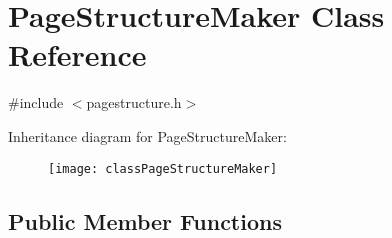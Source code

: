\hypertarget{classPageStructureMaker}{\section{Page\-Structure\-Maker Class Reference}
\label{classPageStructureMaker}
}


{\ttfamily \#include $<$pagestructure.\-h$>$}

Inheritance diagram for Page\-Structure\-Maker\-:\begin{figure}[H]
\begin{center}
\leavevmode
\texttt{[image: classPageStructureMaker]}
\end{center}
\end{figure}
\subsection*{Public Member Functions}
